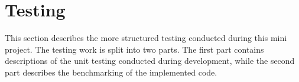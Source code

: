 \chapter{Testing} 

This section describes the more structured testing conducted during this mini project. The testing work is split into two parts. The first part contains descriptions of the unit testing conducted during development, while the second part describes the benchmarking of the implemented code. 